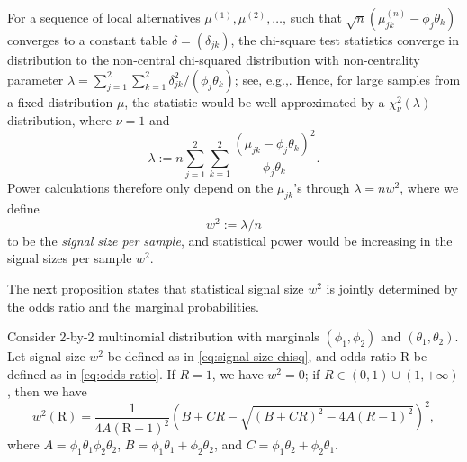 For a sequence of local alternatives $\mu^{(1)}, \mu^{(2)}, \ldots$, such that $\sqrt{n}(\mu^{(n)}_{jk} - \phi_j\theta_k)$ converges to a constant table $\delta = (\delta_{jk})$, the chi-square test statistics converge in distribution to the non-central chi-squared distribution with non-centrality parameter 
$\lambda = \sum_{j=1}^2 \sum_{k=1}^2 {\delta_{jk}^2}/{(\phi_j\theta_k)}$; see, e.g.,\cite{ferguson2017course}.
Hence, for large samples from a fixed distribution $\mu$, the statistic would be well approximated by a $\chi^2_\nu(\lambda)$ distribution, where $\nu=1$ and
\begin{equation} 
\lambda := n\sum_{j=1}^2 \sum_{k=1}^2 \frac{(\mu_{jk} - \phi_j\theta_k)^2}{\phi_j\theta_k}.
\end{equation}
Power calculations therefore only depend on the $\mu_{jk}$'s through $\lambda=nw^2$, where we define 
\begin{equation} \label{eq:signal-size-chisq}
    w^2:=\lambda/n
\end{equation} 
to be the \emph{signal size per sample}, and statistical power would be increasing in the signal sizes per sample $w^2$.

The next proposition states that statistical signal size $w^2$ is jointly determined by the odds ratio and the marginal probabilities.

\begin{proposition} \label{prop:signal-size-odds-ratio}
Consider 2-by-2 multinomial distribution with marginals $(\phi_1, \phi_2)$ and $(\theta_1, \theta_2)$.
Let signal size $w^2$ be defined as in \eqref{eq:signal-size-chisq}, and odds ratio $\text{R}$ be defined as in \eqref{eq:odds-ratio}. 
If $R=1$, we have $w^2 = 0$; if $R\in(0,1)\cup(1,+\infty)$, then we have
\begin{equation} \label{eq:signal-size-odds-ratio}
    w^2(\text{R}) =
    \frac{1}{4A(\text{R}-1)^2}\left(B+CR-\sqrt{(B+CR)^2-4A(R-1)^2}\right)^2,
\end{equation}
where $A = \phi_1\theta_1\phi_2\theta_2$, $B = \phi_1\theta_1+\phi_2\theta_2$, and $C = \phi_1\theta_2+\phi_2\theta_1$.
\end{proposition}


